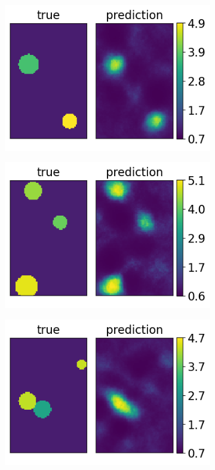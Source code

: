 \documentclass[12pt]{article}
\newcommand{\nhgappwidth}{0.24\linewidth}
\newcommand{\nhgappheight}{2.9cm}
\begin{document}
\begin{appendices}
\begin{figure}[!h]
\begin{subfigure}[c]{\nhgappwidth}
  \end{subfigure}
  \begin{subfigure}[c]{\nhgappwidth}
    \centering    
    \includegraphics[totalheight=\nhgappheight]{Figures/AppendixNew/CNN2/ex10/mu.png}
  \end{subfigure}
  \begin{subfigure}[c]{\nhgappwidth}
    \centering
    \includegraphics[totalheight=\nhgappheight]{Figures/AppendixNew/CNN2/ex11/mu.png}
  \end{subfigure}
  \begin{subfigure}[c]{\nhgappwidth}
    \centering
    \includegraphics[totalheight=\nhgappheight]{Figures/AppendixNew/CNN2/ex12/mu.png}

\end{subfigure}
\end{figure}
\end{appendices}
\end{document}
